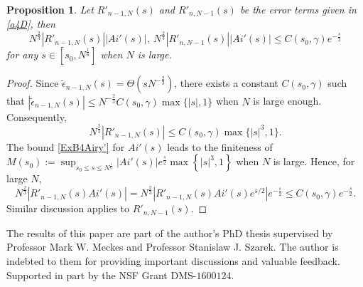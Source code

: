 \documentclass[11pt]{article}
\newtheorem{proposition}[theorem]{Proposition}
\numberwithin{equation}{section}%
\numberwithin{theorem}{section}
\begin{document}
\begin{proposition}\label{error4d}
    Let $R'_{n-1,N}(s)$ and $R'_{n,N-1}(s)$ be the error terms given in \eqref{a4D}, then
    \begin{equation*}
        N^{\frac{2}{3}}|R'_{n-1,N}(s)||Ai'(s)|,~N^{\frac{2}{3}}|R'_{n,N-1}(s)||Ai'(s)|\le C(s_0,\gamma)e^{-\frac{s}{2}}
    \end{equation*}
    for any $s\in\left[s_0,N^\frac{1}{6}\right]$ when $N$ is large.
\end{proposition}
\begin{proof}
    Since $\tilde{\epsilon}_{n-1,N}(s)=\Theta\left(sN^{-\frac{2}{3}}\right)$, there exists a constant $C(s_0,\gamma)$ such that $|\tilde{\epsilon}_{n-1,N}(s)|\le  N^{-\frac{2}{3}}C(s_0,\gamma)\max\{|s|,1\}$ when $N$ is large enough. Consequently,
    \begin{equation*}
        N^{\frac{2}{3}}|R'_{n-1,N}(s)|\le C(s_0,\gamma)\max\{|s|^3,1\}.
    \end{equation*}
    The bound \eqref{ExB4Airy'} for $Ai'(s)$ leads to the finiteness of
        $M(s_0):=\sup_{s_0\le s\le N^\frac{1}{6}} \left|Ai'(s)\right|e^{\frac{s}{2}}\max\left\{|s|^3,1\right\}$
    when $N$ is large. Hence, for large $N$,
    \begin{equation*}
        N^\frac{2}{3}|R'_{n-1,N}(s)Ai'(s)|=N^\frac{2}{3}|R'_{n-1,N}(s)Ai'(s)e^{s/2}|e^{-\frac{s}{2}}\le C(s_0,\gamma)e^{-\frac{s}{2}}.
    \end{equation*}
    Similar discussion applies to $R'_{n,N-1}(s)$.
\end{proof}

\bigskip
{}The results of this paper are part of the author's PhD thesis supervised by Professor Mark W. Meckes and Professor Stanislaw J. Szarek. The author is indebted to them for providing important discussions and valuable feedback. Supported in part by the NSF Grant DMS-$1600124$.

\newpage




\end{document}
